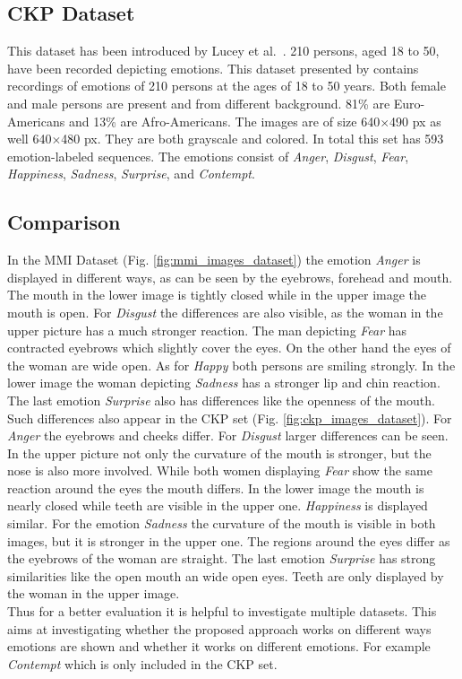 \documentclass[10pt,journal,compsoc, hidelinks]{IEEEtran}
\begin{document}
\subsection{CKP Dataset}
\label{sec:ckp}

This dataset has been introduced by Lucey et al.~\cite{5543262}. 210 persons, aged 18 to 50, have been recorded depicting emotions.
This dataset presented by  contains recordings of emotions of 210 persons at the ages of 18 to 50 years. Both female and male persons are present and from different background. 81\% are Euro-Americans and 13\% are Afro-Americans. The images are of size 640$\times$490 px as well 640$\times$480 px. They are both grayscale and colored. In total this set has 593 emotion-labeled sequences. The emotions consist of \textit{Anger}, \textit{Disgust}, \textit{Fear}, \textit{Happiness}, \textit{Sadness}, \textit{Surprise}, and \textit{Contempt}.



\subsection{Comparison}
\label{sec:comparison}
In the MMI Dataset (Fig. \ref{fig:mmi_images_dataset}) the emotion \textit{Anger} is displayed in different ways, as can be seen by the eyebrows, forehead and mouth. The mouth in the lower image is tightly closed while in the upper image the mouth is open. For \textit{Disgust} the differences are also visible, as the woman in the upper picture has a much stronger reaction. The man depicting \textit{Fear} has contracted eyebrows which slightly cover the eyes. On the other hand the eyes of the woman are wide open. As for \textit{Happy} both persons are smiling strongly. In the lower image the woman depicting \textit{Sadness} has a stronger lip and chin reaction. The last emotion \textit{Surprise} also has differences like the openness of the mouth.\\

Such differences also appear in the CKP set (Fig. \ref{fig:ckp_images_dataset}). 
For \textit{Anger} the eyebrows and cheeks differ.
For \textit{Disgust} larger differences can be seen. In the upper picture not only the curvature of the mouth is stronger, but the nose is also more involved. While both women displaying \textit{Fear} show the same reaction around the eyes the mouth differs. In the lower image the mouth is nearly closed while teeth are visible in the upper one. \textit{Happiness} is displayed similar. For the emotion \textit{Sadness} the curvature of the mouth is visible in both images, but it is stronger in the upper one. The regions around the eyes differ as the eyebrows of the woman are straight. The last emotion \textit{Surprise} has strong similarities like the open mouth an wide open eyes. Teeth are only displayed by the woman in the upper image.\\
Thus for a better evaluation it is helpful to investigate multiple datasets. This aims at investigating whether the proposed approach works on different ways emotions are shown and whether it works on different emotions. For example \textit{Contempt} which is only included in the CKP set.
\end{document}
